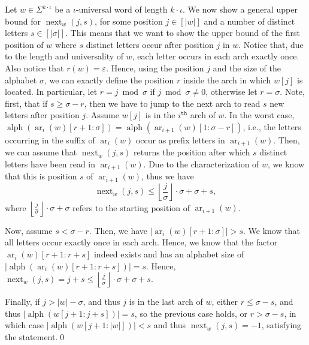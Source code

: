 \documentclass[10pt,a4paper]{amsart}
\makeatletter
\DeclareMathOperator{\ar}{ar}
\DeclareMathOperator{\alphabet}{alph}
\DeclareMathOperator{\al}{alph}
\DeclareMathOperator{\nextAlphPos}{next}
\theoremstyle{plain}
\theoremstyle{definition}
\renewenvironment{proof}[1][\proofname]{\par
  \pushQED{}%
  \normalfont \topsep6\p@\@plus6\p@\relax
  \trivlist
  \item[\hskip\labelsep\itshape #1\@addpunct{.}]\ignorespaces
}{%
  \popQED\endtrivlist\@endpefalse
}
\makeatother
\begin{document}
\begin{proof}
	Let $w\in\Sigma^{k\cdot\iota}$ be a $\iota$-universal word of length $k\cdot\iota$. We now show a general upper bound for $\nextAlphPos_w(j,s)$, for some position $j\in[|w|]$ and a number of distinct letters $s\in[|\sigma|]$. This means that we want to show the upper bound of the first position of $w$ where $s$ distinct letters occur after position $j$ in $w$. Notice that, due to the length and universality of $w$, each letter occurs in each arch exactly once. Also notice that $r(w)=\varepsilon$. Hence, using the position $j$ and the size of the alphabet $\sigma$, we can exactly define the position $r$ inside the arch in which $w[j]$ is located.
	In particular, let $r = j\bmod\sigma$ if $j\bmod\sigma\neq0$, otherwise let $r = \sigma$.
	Note, first, that if $s \geq \sigma - r$, then we have to jump to the next arch to read $s$ new letters after position $j$. Assume $w[j]$ is in the $i^{\mathtt{th}}$ arch of $w$.
	In the worst case, $\al(\ar_i(w)[r+1 : \sigma]) = \al(\ar_{i+1}(w)[1 : \sigma-r])$, i.e., the letters occurring in the suffix of $\ar_i(w)$ occur as prefix letters in $\ar_{i+1}(w)$. Then, we can assume that $\nextAlphPos_w(j,s)$ returns the position after which $s$ distinct letters have been read in $\ar_{i+1}(w)$. Due to the characterization of $w$, we know that this is position $s$ of $\ar_{i+1}(w)$, thus we have
	$$ \nextAlphPos_w(j,s) \leq \left\lfloor\frac{j}{\sigma}\right\rfloor\cdot\sigma + \sigma + s, $$
	where $\left\lfloor\frac{j}{\sigma}\right\rfloor\cdot\sigma + \sigma$ refers to the starting position of $\ar_{i+1}(w)$.

	Now, assume $s < \sigma-r$. Then, we have $|\ar_i(w)[r+1 : \sigma]| > s$. We know that all letters occur exactly once in each arch. Hence, we know that the factor $\ar_i(w)[r+1 : r+s]$ indeed exists and has an alphabet size of $|\al(\ar_i(w)[r+1 : r+s])| = s$. Hence, $\nextAlphPos_w(j,s) = j+s \leq \left\lfloor\frac{j}{\sigma}\right\rfloor\cdot\sigma + \sigma + s$.

	Finally, if $j > |w| - \sigma$, and thus $j$ is in the last arch of $w$, either $r \leq \sigma - s$, and thus $\vert \alphabet(w[j + 1:j + s]) \vert = s$, so the previous case holds, or $r > \sigma - s$, in which case $\vert \alphabet(w[j + 1:\vert w \vert]) \vert < s$ and thus $\nextAlphPos_w(j,s) = -1$, satisfying the statement.\qed
	
	
\end{proof}
\end{document}
